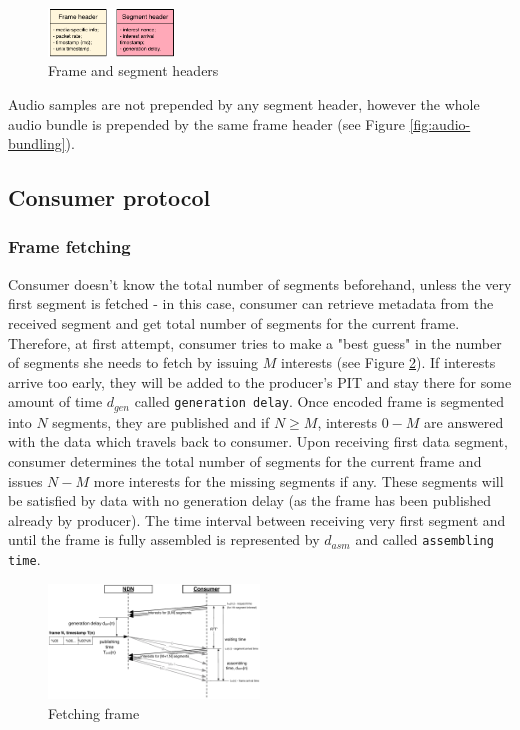\documentclass[10pt]{proc}
\begin{document}
\begin{figure}[t!]
\centering
\includegraphics[width=0.3\textwidth]{data-struct}
\caption{Frame and segment headers}
\label{fig:data-struct}
\end{figure}

Audio samples are not prepended by any segment header, however the whole audio bundle is prepended by the same frame header (see Figure \ref{fig:audio-bundling}).

\subsection{Consumer protocol}

\subsubsection{Frame fetching}

Consumer doesn't know the total number of segments beforehand, unless the very first segment is fetched - in this case, consumer can retrieve metadata from the received segment and get total number of segments for the current frame. 
Therefore, at first attempt, consumer tries to make a "best guess" in the number of segments she needs to fetch by issuing $M$ interests (see Figure \ref{fig:pull}). If interests arrive too early, they will be added to the producer's PIT and stay there for some amount of time $d_{gen}$ called \texttt{generation delay}. Once encoded frame is segmented into $N$ segments, they are published and if $N\geq M$, interests $0 - M$ are answered with the data  which travels back to consumer. Upon receiving first data segment, consumer determines the total number of segments for the current frame and issues $N - M$ more interests for the missing segments if any. These segments will be satisfied by data with no generation delay (as the frame has been published already by producer). The time interval between receiving very first segment and until the frame is fully assembled is represented by $d_{asm}$ and called \texttt{assembling time}.

\begin{figure}[t!]
\centering
\includegraphics[width=0.5\textwidth]{frame-fetch}
\caption{Fetching frame}
\label{fig:pull}
\end{figure}
\end{document}
